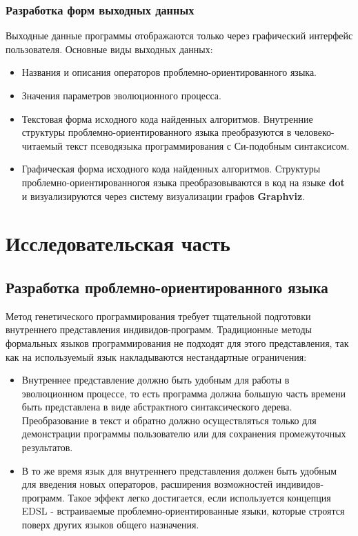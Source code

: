 \documentclass[russian,utf8,emptystyle]{eskdtext}
\begin{document}
\begin{spacing}{1.5}
\subsubsection{Разработка форм выходных данных}

Выходные данные программы отображаются только через графический интерфейс пользователя. Основные виды выходных данных:
\begin{itemize}
\item Названия и описания операторов проблемно-ориентированного языка.
\item Значения параметров эволюционного процесса.
\item Текстовая форма исходного кода найденных алгоритмов. Внутренние структуры проблемно-ориентированного языка преобразуются в человеко-читаемый текст псеводязыка программирования с Си-подобным синтаксисом.
\item Графическая форма исходного кода найденных алгоритмов. Структуры проблемно-ориентированногоя языка преобразовываются в код на языке \textbf{dot} и визуализируются через систему визуализации графов \textbf{Graphviz}.
\end{itemize}


\newpage
\section{Исследовательская часть}
\subsection{Разработка проблемно-ориентированного языка}
Метод генетического программирования требует тщательной подготовки внутреннего представления индивидов-программ. Традиционные методы формальных языков программирования не подходят для этого представления, так как на используемый язык накладываются нестандартные ограничения:
\begin{itemize}
\item Внутреннее представление должно быть удобным для работы в эволюционном процессе, то есть программа должна большую часть времени быть представлена в виде абстрактного синтаксического дерева. Преобразование в текст и обратно должно осуществляться только для демонстрации программы пользователю или для сохранения промежуточных результатов.
\item В то же время язык для внутреннего представления должен быть удобным для введения новых операторов, расширения возможностей индивидов-программ. Такое эффект легко достигается, если используется концепция EDSL - встраиваемые проблемно-ориентированные языки, которые строятся поверх других языков общего назначения.
\end{itemize}


\end{spacing}
\end{document}
